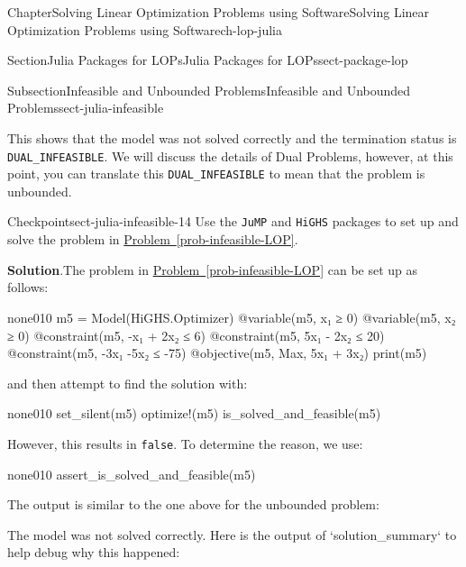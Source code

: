 \documentclass[oneside,10pt,]{book}
\newcommand{\blocktitlefont}{\relax}
\newcommand{\xreffont}{\relax}
\newcommand{\mono}[1]{\texttt{#1}}
\numberwithin{equation}{section}
\begin{document}
\begin{chapterptx}{Chapter}{Solving Linear Optimization Problems using Software}{}{Solving Linear Optimization Problems using Software}{}{}{ch-lop-julia}
\begin{sectionptx}{Section}{Julia Packages for LOPs}{}{Julia Packages for LOPs}{}{}{sect-package-lop}
\begin{subsectionptx}{Subsection}{Infeasible and Unbounded Problems}{}{Infeasible and Unbounded Problems}{}{}{sect-julia-infeasible}
%
\par
This shows that the model was not solved correctly and the termination status is \mono{DUAL\_INFEASIBLE}. We will discuss the details of Dual Problems, however, at this point, you can translate this \mono{DUAL\_INFEASIBLE} to mean that the problem is unbounded.%
\begin{inlineexercise}{Checkpoint}{}{sect-julia-infeasible-14}%
Use the \mono{JuMP} and \mono{HiGHS} packages to set up and solve the problem in \hyperref[prob-infeasible-LOP]{Problem~{\xreffont\ref{prob-infeasible-LOP}}}.%
\par\smallskip%
\noindent\textbf{\blocktitlefont Solution}.\hypertarget{sect-julia-infeasible-14-2}{}\quad{}The problem in \hyperref[prob-infeasible-LOP]{Problem~{\xreffont\ref{prob-infeasible-LOP}}} can be set up as follows:%
\begin{program}{none}{0}{1}{0}
m5 = Model(HiGHS.Optimizer)
@variable(m5, x₁ ≥ 0)
@variable(m5, x₂ ≥ 0)
@constraint(m5, -x₁ + 2x₂ ≤ 6)
@constraint(m5, 5x₁ - 2x₂ ≤ 20)
@constraint(m5, -3x₁ -5x₂ ≤ -75)
@objective(m5, Max, 5x₁ + 3x₂)
print(m5)
\end{program}
and then attempt to find the solution with:%
\begin{program}{none}{0}{1}{0}
    set_silent(m5)
optimize!(m5)
is_solved_and_feasible(m5)
\end{program}
However, this results in \mono{false}. To determine the reason, we use:%
\begin{program}{none}{0}{1}{0}
assert_is_solved_and_feasible(m5)
\end{program}
The output is similar to the one above for the unbounded problem:%
\par
%
\begin{codedisplay}
The model was not solved correctly. Here is the output of `solution_summary` to help debug why this happened:


\end{codedisplay}
\end{inlineexercise}
\end{subsectionptx}
\end{sectionptx}
\end{chapterptx}
\end{document}
